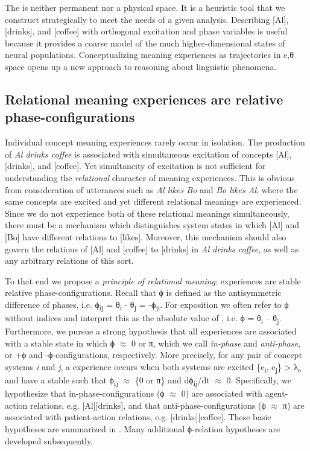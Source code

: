   The  is neither permanent nor a physical space. It is a heuristic tool that we construct strategically to meet the needs of a given analysis. Describing [Al], [drinks], and [coffee] with orthogonal excitation and phase variables is useful because it provides a coarse model of the much higher-dimensional states of neural populations. Conceptualizing meaning experiences as trajectories in e,θ space opens up a new approach to reasoning about linguistic phenomena.

\subsection{Relational meaning experiences are relative phase-configurations}

Individual concept meaning experiences rarely occur in isolation. The production of \textit{Al drinks coffee} is associated with simultaneous excitation of concepts [Al], [drinks], and [coffee]. Yet simultaneity of excitation is not sufficient for understanding the \textit{relational} character of meaning experiences. This is obvious from consideration of utterances such as \textit{Al likes Bo} and \textit{Bo likes Al}, where the same concepts are excited and yet different relational meanings are experienced. Since we do not experience both of these relational meanings simultaneously, there must be a mechanism which distinguishes system states in which [Al] and [Bo] have different relations to [likes]. Moreover, this mechanism should also govern the relations of [Al] and [coffee] to [drinks] in \textit{Al drinks coffee}, as well as any arbitrary relations of this sort. 

  To that end we propose a \textit{principle of relational meaning}:  experiences are stable relative phase-configurations. Recall that  ϕ is defined as the antisymmetric difference of phases, i.e. ϕ\textsubscript{ij} = θ\textsubscript{i} - θ\textsubscript{j} = -ϕ\textsubscript{ji}. For exposition we often refer to ϕ without indices and interpret this as the absolute value of , i.e. {\textbar}ϕ{\textbar} = {\textbar}θ\textsubscript{i} – θ\textsubscript{j}{\textbar}. Furthermore, we pursue a strong hypothesis that all  experiences are associated with a stable state in which ϕ ${\approx}$ 0 or π, which we call \textit{in-phase} and \textit{anti-phase}, or +ϕ and -ϕ-configurations, respectively. More precisely, for any pair of concept systems \textit{i} and \textit{j}, a  experience occurs when both systems are excited \{e\textsubscript{i}, e\textsubscript{j}\} > λ\textsubscript{e} and have a stable  such that {\textbar}ϕ\textsubscript{ij}{\textbar} ${\approx}$ \{0 or π\} and dϕ\textsubscript{ij}/dt ${\approx}$ 0. Specifically, we hypothesize that in-phase-configurations (ϕ ${\approx}$ 0) are associated with agent-action relations, e.g. [Al][drinks], and that anti-phase-configurations (ϕ ${\approx}$ π) are associated with patient-action relations, e.g. [drinks][coffee]. These basic hypotheses are summarized in {}. Many additional ϕ-relation hypotheses are developed subsequently.

